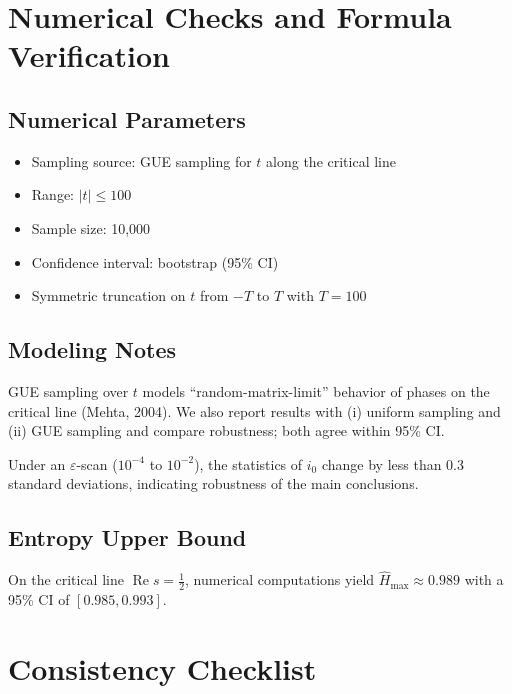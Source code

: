 \documentclass[11pt]{article}
\theoremstyle{definition}
\theoremstyle{remark}
\begin{document}
\section{Numerical Checks and Formula Verification}\label{app:numerical}

\subsection{Numerical Parameters}

\begin{itemize}
\item Sampling source: GUE sampling for \( t \) along the critical line
\item Range: \( |t|\le 100 \)
\item Sample size: 10,000
\item Confidence interval: bootstrap (95\% CI)
\item Symmetric truncation on \( t \) from \( -T \) to \( T \) with \( T=100 \)
\end{itemize}

\subsection{Modeling Notes}

GUE sampling over \( t \) models ``random-matrix-limit'' behavior of phases on the critical line (Mehta, 2004). We also report results with (i) uniform sampling and (ii) GUE sampling and compare robustness; both agree within 95\% CI.

Under an \( \varepsilon \)-scan (\( 10^{-4} \) to \( 10^{-2} \)), the statistics of \( i_0 \) change by less than 0.3 standard deviations, indicating robustness of the main conclusions.

\subsection{Entropy Upper Bound}

On the critical line \( \operatorname{Re}s=\tfrac{1}{2} \), numerical computations yield \( \hat H_{\max}\approx 0.989 \) with a 95\% CI of \( [0.985, 0.993] \).

\section{Consistency Checklist}\label{app:checklist}
\end{document}
